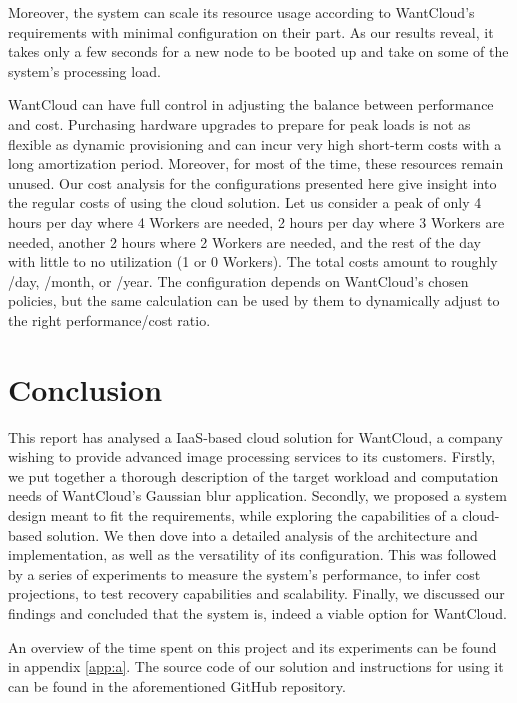 \documentclass{acm_proc_article-sp}
\begin{document}
Moreover, the system can scale its resource usage according to WantCloud's requirements with minimal configuration on their part. 
As our results reveal, it takes only a few seconds for a new node to be booted up and take on some of the system's processing load. 

WantCloud can have full control in adjusting the balance between performance and cost. 
Purchasing hardware upgrades to prepare for peak loads is not as flexible as dynamic provisioning and can incur very high short-term costs with a long amortization period. 
Moreover, for most of the time, these resources remain unused. 
Our cost analysis for the configurations presented here give insight into the regular costs of using the cloud solution. 
Let us consider a peak of only 4 hours per day where 4 Workers are needed, 2 hours per day where 3 Workers are needed, another 2 hours where 2 Workers are needed, and the rest of the day with little to no utilization (1 or 0 Workers).
The total costs amount to roughly /day, /month, or /year.
The configuration depends on WantCloud's chosen policies, but the same calculation can be used by them to dynamically adjust to the right performance/cost ratio.


\section{Conclusion}
\label{sec:conclusion}
This report has analysed a IaaS-based cloud solution for WantCloud, a company wishing to provide advanced image processing services to its customers.
 Firstly, we put together a thorough description of the target workload and computation needs of WantCloud's Gaussian blur application. 
Secondly, we proposed a system design meant to fit the requirements, while exploring the capabilities of a cloud-based solution.
We then dove into a detailed analysis of the architecture and implementation, as well as the versatility of its configuration.
This was followed by a series of experiments to measure the system's performance, to infer cost projections, to test recovery capabilities and scalability.
Finally, we discussed our findings and concluded that the system is, indeed a viable option for WantCloud.

An overview of the time spent on this project and its experiments can be found in appendix \ref{app:a}.
The source code of our solution and instructions for using it can be found in the aforementioned GitHub repository\cite{web:git}.
\end{document}
